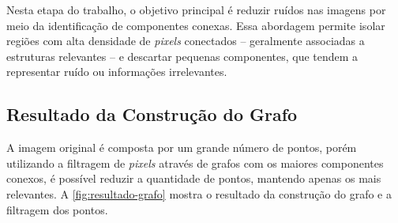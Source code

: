 
 Nesta etapa do trabalho, o objetivo principal é reduzir ruídos nas imagens por meio da identificação de componentes conexas. Essa abordagem permite isolar regiões com alta densidade de \textit{pixels} conectados -- geralmente associadas a estruturas relevantes -- e descartar pequenas componentes, que tendem a representar ruído ou informações irrelevantes.


\subsection{Resultado da Construção do Grafo}
\label{sec:resultado-construcao-grafo}

A imagem original é composta por um grande número de pontos, porém utilizando a filtragem de \textit{pixels} através de grafos com os maiores componentes conexos, é possível reduzir a quantidade de pontos, mantendo apenas os mais relevantes. A \autoref{fig:resultado-grafo} mostra o resultado da construção do grafo e a filtragem dos pontos.

